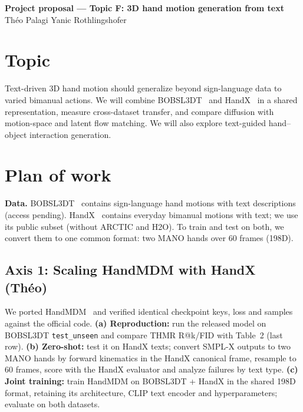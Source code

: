 \documentclass[10pt]{article}
\newcommand{\todo}[1]{\textcolor{red}{[TODO: #1]}}
\begin{document}
\begin{center}
  {\large\bfseries Project proposal — Topic F: 3D hand motion generation from text}\\[2pt]
  Théo Palagi \quad Yanic Rothlingshofer \qquad
\end{center}

\section{Topic}
Text-driven 3D hand motion should generalize beyond sign-language data to varied bimanual actions. We will combine BOBSL3DT~\cite{handmdm} and HandX~\cite{handx} in a shared representation, measure cross-dataset transfer, and compare diffusion with motion-space and latent flow matching. We will also explore text-guided hand--object interaction generation.

\section{Plan of work}

\textbf{Data.} BOBSL3DT~\cite{handmdm} contains sign-language hand motions with text descriptions (access pending). HandX~\cite{handx} contains everyday bimanual motions with text; we use its public subset (without ARCTIC and H2O). To train and test on both, we convert them to one common format: two MANO hands over 60 frames (198D).

\subsection*{Axis 1: Scaling HandMDM with HandX (Théo)}
We ported HandMDM~\cite{handmdm} and verified identical checkpoint keys, loss and samples against the official code. \textbf{(a) Reproduction:} run the released model on BOBSL3DT \texttt{test\_unseen} and compare THMR R@k/FID with Table~2 (last row). \textbf{(b) Zero-shot:} test it on HandX texts; convert SMPL-X outputs to two MANO hands by forward kinematics in the HandX canonical frame, resample to 60 frames, score with the HandX evaluator and analyze failures by text type. \textbf{(c) Joint training:} train HandMDM on BOBSL3DT + HandX in the shared 198D format, retaining its architecture, CLIP text encoder and hyperparameters; evaluate on both datasets.
\end{document}
